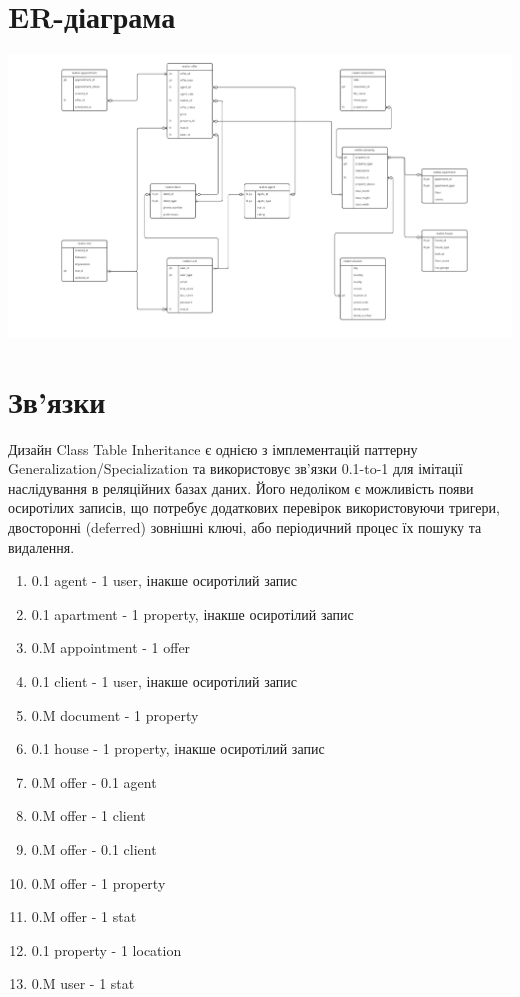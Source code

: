 \section{ER-діаграма}

\includegraphics[width=1\linewidth]{../assets/er.pdf}

\section{Зв'язки}

Дизайн Class Table Inheritance є однією з імплементацій паттерну
Generalization/Specialization та використовує зв'язки 0.1-to-1
для імітації наслідування в реляційних базах даних. Його недоліком є
можливість появи осиротілих записів, що потребує додаткових перевірок
використовуючи тригери, двосторонні (deferred) зовнішні ключі,
або періодичний процес їх пошуку та видалення.

\begin{enumerate}
    \item 0.1 agent - 1 user, інакше осиротілий запис
    \item 0.1 apartment - 1 property, інакше осиротілий запис
    \item 0.M appointment - 1 offer
    \item 0.1 client - 1 user, інакше осиротілий запис
    \item 0.M document - 1 property
    \item 0.1 house - 1 property, інакше осиротілий запис
    \item 0.M offer - 0.1 agent
    \item 0.M offer - 1 client
    \item 0.M offer - 0.1 client
    \item 0.M offer - 1 property
    \item 0.M offer - 1 stat
    \item 0.1 property - 1 location
    \item 0.M user - 1 stat
\end{enumerate}
